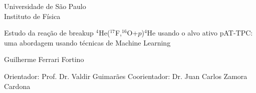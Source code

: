 \documentclass[a4paper,12pt,oneside]{book}
\begin{document}
\renewcommand*\contentsname{Sumário}
\renewcommand{\listfigurename}{Lista de figuras}
\renewcommand{\listoftables}{Tabelas}
\renewcommand{\listofalgorithms}{Lista de algoritmos}
\makeatletter
\renewcommand{\@chapapp}{Capítulo}
\makeatother
\addtocounter{page}{0}


\thispagestyle{empty}
\begin{center}

	{\fontsize{16}{16} \selectfont Universidade de S\~ao Paulo \\}
	\vspace{0.1cm}
	{\fontsize{16}{16} \selectfont Instituto de F\'{i}sica}
    \vspace{2.2cm}

	{\fontsize{22}{22}\selectfont Estudo da reação de breakup $^4$He($^{17}$F,$^{16}$O+$p$)$^4$He usando o alvo ativo pAT-TPC: uma abordagem usando técnicas de Machine Learning\par}
    \vspace{2cm}


    {\fontsize{18}{18}\selectfont Guilherme Ferrari Fortino\par}

    \vspace{1.4cm}

\end{center}

\leftskip 6cm
\begin{flushright}	
\leftskip 6cm
Orientador: Prof. Dr.  Valdir Guimar\~{a}es\hfill{ \hskip 5cm  } 
\leftskip 6cm
\newline
Coorientador: Dr. Juan Carlos Zamora Cardona\hfill{ \hskip 4cm  }
\end{flushright}	

\vspace{0.6cm}    

\end{document}
